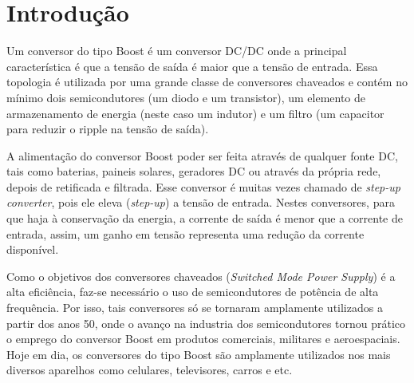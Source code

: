 \newpage
\section{Introdução}

Um conversor do tipo Boost é um conversor DC/DC onde a principal característica é que a tensão de saída é maior que a tensão de entrada. Essa topologia é utilizada por uma grande classe de conversores chaveados e contém no mínimo dois semicondutores (um diodo e um transistor), um elemento de armazenamento de energia (neste caso um indutor) e um filtro (um capacitor para reduzir o ripple na tensão de saída).

A alimentação do conversor Boost poder ser feita através de qualquer fonte DC, tais como baterias, paineis solares, geradores DC ou através da própria rede, depois de retificada e filtrada.
Esse conversor é muitas vezes chamado de \textit{step-up converter}, pois ele eleva (\textit{step-up}) a tensão de entrada. Nestes conversores, para que haja à conservação da energia, a corrente de saída é menor que a corrente de entrada, assim, um ganho em tensão representa uma redução da corrente disponível.

Como o objetivos dos conversores chaveados (\textit{Switched Mode Power Supply}) é a alta eficiência, faz-se necessário o uso de semicondutores de potência de alta frequência. Por isso, tais conversores só se tornaram amplamente utilizados a partir dos anos 50, onde o avanço na industria dos semicondutores tornou prático o emprego do conversor Boost em produtos comerciais, militares e  aeroespaciais. Hoje em dia, os conversores do tipo Boost são amplamente utilizados nos mais diversos aparelhos como celulares, televisores, carros e etc. 